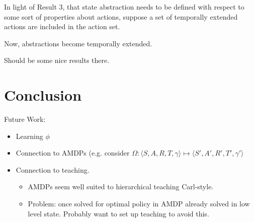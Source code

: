\documentclass[11pt]{amsart}
\begin{document}
In light of Result 3, that state abstraction needs to be defined with respect to some sort of properties about actions, suppose a set of temporally extended actions are included in the action set.

Now, abstractions become temporally extended.

Should be some nice results there.




\newpage
\section{Conclusion}

Future Work:
\begin{itemize}
\item Learning $\phi$
\item Connection to AMDPs (e.g. consider $\Omega : \langle S, A, R, T, \gamma \rangle \mapsto \langle S', A', R', T', \gamma' \rangle$
\item Connection to teaching.
\begin{itemize}
\item AMDPs seem well suited to hierarchical teaching Carl-style.
\item Problem: once solved for optimal policy in AMDP already solved in low level state. Probably want to set up teaching to avoid this.
\end{itemize}
\end{itemize}



\newpage

\end{document}
